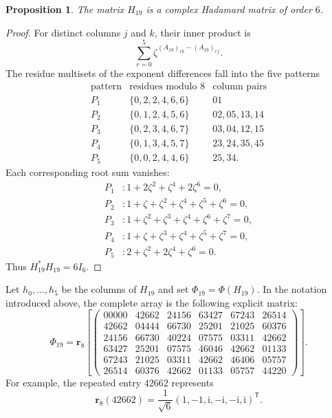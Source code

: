 \documentclass[11pt,a4paper]{article}
\newcommand{\ii}{\mathrm{i}}
\newtheorem{proposition}{Proposition}
\begin{document}
\begin{proposition}\label{prop:H19had}
The matrix $H_{19}$ is a complex Hadamard matrix of order $6$.
\end{proposition}

\begin{proof}
For distinct columns $j$ and $k$, their inner product is
\[
  \sum_{r=0}^5 \zeta^{(A_{19})_{rk}-(A_{19})_{rj}}.
\]
The residue multisets of the exponent differences fall into the five patterns
\[
\begin{array}{c|c|c}
\text{pattern}&\text{residues modulo }8&\text{column pairs}\\
\hline
P_1&\{0,2,2,4,6,6\}&01\\
P_2&\{0,1,2,4,5,6\}&02,05,13,14\\
P_3&\{0,2,3,4,6,7\}&03,04,12,15\\
P_4&\{0,1,3,4,5,7\}&23,24,35,45\\
P_5&\{0,0,2,4,4,6\}&25,34.
\end{array}
\]
Each corresponding root sum vanishes:
\[
\begin{aligned}
P_1&: 1+2\zeta^2+\zeta^4+2\zeta^6=0,\\
P_2&: 1+\zeta+\zeta^2+\zeta^4+\zeta^5+\zeta^6=0,\\
P_3&: 1+\zeta^2+\zeta^3+\zeta^4+\zeta^6+\zeta^7=0,\\
P_4&: 1+\zeta+\zeta^3+\zeta^4+\zeta^5+\zeta^7=0,\\
P_5&: 2+\zeta^2+2\zeta^4+\zeta^6=0.
\end{aligned}
\]
Thus $H_{19}^*H_{19}=6I_6$.
\end{proof}

Let $h_0,\ldots,h_5$ be the columns of $H_{19}$ and set
$\Phi_{19}=\Phi(H_{19})$.  In the notation introduced above, the complete
array is the following explicit matrix:
\begin{equation}\label{eq:explicit19}
\Phi_{19}=\mathbf r_8\!\left[
\begin{pmatrix}
00000&42662&24156&63427&67243&26514\\
42662&04444&66730&25201&21025&60376\\
24156&66730&40224&07575&03311&42662\\
63427&25201&07575&46046&42662&01133\\
67243&21025&03311&42662&46406&05757\\
26514&60376&42662&01133&05757&44220
\end{pmatrix}
\right].
\end{equation}
For example, the repeated entry $42662$ represents
\[
 \mathbf r_8(42662)
 =\frac1{\sqrt6}(1,-1,\ii,-\ii,-\ii,\ii)^{\mathsf T}.
\]
\end{document}
